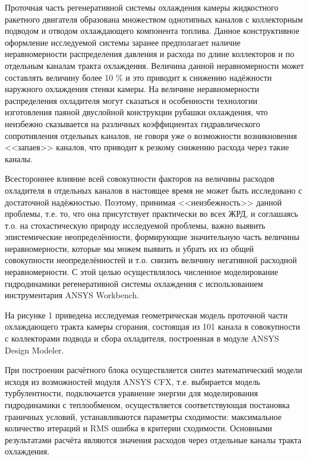 
\vzmscaption


Проточная часть регенеративной системы охлаждения камеры жидкостного ракетного двигателя
образована множеством однотипных каналов с коллекторным подводом и отводом охлаждающего компонента топлива.
Данное конструктивное оформление исследуемой системы заранее пре\-д\-полагает
наличие неравномерности распределения давления и расхода по длине коллекторов и по отдельным каналам тракта охлаждения.
Величина данной неравномерности может составлять величину более 10 $\%$
и это приводит к снижению надёжности наружного охлаждения стенки камеры.
На величине неравномерности распределения охладителя могут сказаться
и особенности технологии изготовления паяной двуслойной конструкции рубашки охлаждения,
что неизбежно сказывается на различных коэффициентах гидравлического сопротивления отдельных каналов,
не говоря уже о возможности возникновения <<запаев>> каналов, что приводит к резкому снижению расхода через такие каналы.

Всестороннее влияние всей совокупности факторов на величины расходов охладителя в отдельных каналов
в настоящее время не может быть исследовано с достаточной надёжностью.
Поэтому, принимая <<неизбежность>> данной проблемы, т.е. то, что она присутствует практически во всех ЖРД,
и соглашаясь т.о. на стохастическую природу исследуемой проблемы, важно выявить эпистемические неопределённости,
формирующие значительную часть величины неравномерности,
которые мы можем выявить и убрать их из общей совокупности неопределённостей
и т.о. снизить величину негативной расходной неравномерности.
С этой целью осуществлялось численное моделирование гидродинамики регенеративной системы охлаждения с использованием инструментария ANSYS Workbench.

На рисунке 1 приведена исследуемая геометрическая модель проточной части охлаждающего тракта камеры сгорания,
состоящая из 101 канала в совокупности с коллекторами подвода и сбора охладителя,
построенная в модуле ANSYS Design Modeler.

При построении расчётного блока осуществляется синтез математический модели исходя из возможностей модуля ANSYS CFX, т.е. выбирается модель турбулентности, подключается уравнение энергии для моделирования гидродинамики с теплообменом, осуществляется соответствующая постановка граничных условий, устанавливаются параметры сходимости: максимальное количество итераций и RMS ошибка в критерии сходимости. Основными результатами расчёта являются значения расходов через отдельные каналы тракта охлаждения.

